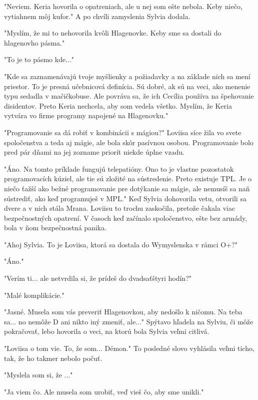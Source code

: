 \documentclass{book}
\begin{document}
"$ $Neviem. Keria hovorila o opatreniach, ale u nej som ešte nebola. Keby niečo, vytiahnem môj kufor."$ $  A po chvíli zamyslenia Sylvia dodala.

"$ $Myslím, že mi to nehovorila kvôli Hlagenovke. Keby sme sa dostali do hlagenovho pásma."$ $ 

"$ $To je to pásmo kde..."$ $ 

"$ $Kde sa zaznamenávajú tvoje myšlienky a požiadavky a na základe nich sa mení priestor. To je presná učebnicová definícia. Sú dobré, ak sú na veci, ako menenie typu sedadla v mačičkobuse. Ale povráva sa, že ich Cecília používa na špehovanie disidentov. Preto Keria nechcela, aby som vedela všetko. Myslím, že Keria vytvára vo firme programy napojené na Hlagenovku."$ $ 

"$ $Programovanie sa dá robiť v kombinácii s mágiou?"$ $  Loviisa síce žila vo svete spoločenstva a teda aj mágie, ale bola skôr pasívnou osobou. Programovanie bolo pred pár dňami na jej zozname priorít niekde úplne vzadu.

"$ $Áno. Na tomto príklade fungujú telepatióny. Ono to je vlastne pozostatok programovacích kúziel, ale tie sú zložité na sústredenie. Preto existuje TPL. Je o niečo ťažší ako bežné programovanie pre dotýkanie sa mágie, ale nemusíš sa naň sústrediť, ako keď programuješ v MPL."$ $  Keď Sylvia dohovorila vetu, otvorili sa dvere a v nich stála Mrana. Loviisu to trochu zaskočila, pretože čakala viac bezpečnostných opatrení. V časoch keď začínalo spoločenstvo, ešte bez armády, bola v ňom bezpečnostná panika.

"$ $Ahoj Sylvia. To je Loviisa, ktorá sa dostala do Wymyslenska v rámci O+?"$ $ 

"$ $Áno."$ $ 

"$ $Verím ti... ale netvrdila si, že prídeš do dvadsaťštyri hodín?"$ $ 

"$ $Malé komplikácie."$ $ 

"$ $Jasné. Musela som vás preveriť Hlagenovkou, aby nedošlo k ničomu. Na teba sa... no nemôže D ani nikto iný zmeniť, ale..."$ $  Spýtavo hľadela na Sylviu, či môže pokračovať, lebo hovorila o veci, na ktorú bola Sylvia veľmi citlivá.

"$ $Loviisa o tom vie. To, že som... Démon."$ $  To posledné slovo vyhlásila veľmi ticho, tak, že ho takmer nebolo počuť.

"$ $Myslela som si, že ..."$ $ 

"$ $Ja viem čo. Ale musela som urobiť, veď vieš čo, aby sme unikli."$ $ 
\end{document}
